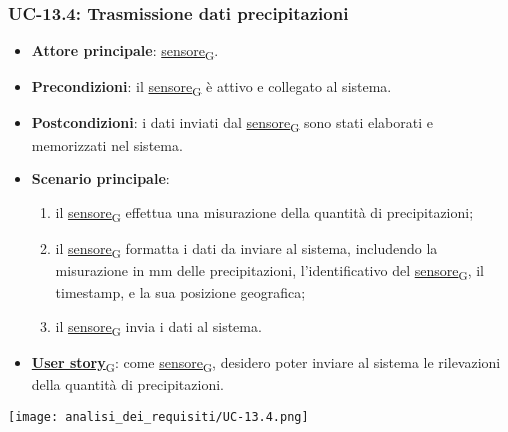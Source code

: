 \subsubsection{UC-13.4: Trasmissione dati precipitazioni}
\begin{itemize}
	\item \textbf{Attore principale}: \href{https://7last.github.io/docs/pb/documentazione-interna/glossario\#sensore}{sensore\textsubscript{G}}.
	\item \textbf{Precondizioni}: il \href{https://7last.github.io/docs/pb/documentazione-interna/glossario\#sensore}{sensore\textsubscript{G}} è attivo e collegato al sistema.
	\item \textbf{Postcondizioni}: i dati inviati dal \href{https://7last.github.io/docs/pb/documentazione-interna/glossario\#sensore}{sensore\textsubscript{G}} sono stati elaborati e memorizzati nel sistema.
	\item \textbf{Scenario principale}:
	      \begin{enumerate}
		      \item il \href{https://7last.github.io/docs/pb/documentazione-interna/glossario\#sensore}{sensore\textsubscript{G}} effettua una misurazione della quantità di precipitazioni;
		      \item il \href{https://7last.github.io/docs/pb/documentazione-interna/glossario\#sensore}{sensore\textsubscript{G}} formatta i dati da inviare al sistema, includendo la misurazione in mm delle precipitazioni, l'identificativo del \href{https://7last.github.io/docs/pb/documentazione-interna/glossario\#sensore}{sensore\textsubscript{G}},
		            il timestamp, e la sua posizione geografica;
		      \item il \href{https://7last.github.io/docs/pb/documentazione-interna/glossario\#sensore}{sensore\textsubscript{G}} invia i dati al sistema.
	      \end{enumerate}
	\item \href{https://7last.github.io/docs/pb/documentazione-interna/glossario\#user-story}{\textbf{User story}\textsubscript{G}}: come \href{https://7last.github.io/docs/pb/documentazione-interna/glossario\#sensore}{sensore\textsubscript{G}}, desidero poter inviare al sistema le rilevazioni della quantità di precipitazioni.
\end{itemize}

\begin{center}
	\texttt{[image: analisi\_dei\_requisiti/UC-13.4.png]}
\end{center}
